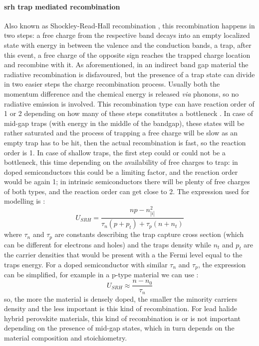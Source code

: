 		\paragraph{\gls{srh} trap mediated recombination}
		Also known as Shockley-Read-Hall recombination \cite{Shockley1952}, this recombination happens in two steps: a free charge from the respective band decays into an empty localized state with energy in between the valence and the conduction bands, a trap, after this event, a free charge of the opposite sign reaches the trapped charge location and recombine with it.
		As aforementioned, in an indirect band gap material the radiative recombination is disfavoured, but the presence of a trap state can divide in two easier steps the charge recombination process.
		Usually both the momentum difference and the chemical energy is released \textsl{via} phonons, so no radiative emission is involved.
		This recombination type can have reaction order of 1 or 2 depending on how many of these steps constitutes a bottleneck \cite{Calado2019}.
		In case of mid-gap traps (with energy in the middle of the bandgap), these states will be rather saturated and the process of trapping a free charge will be slow as an empty trap has to be hit, then the actual recombination is fast, so the reaction order is 1.
		In case of shallow traps, the first step could or could not be a bottleneck, this time depending on the availability of free charges to trap: in doped semiconductors this could be a limiting factor, and the reaction order would be again 1; in intrinsic semiconductors there will be plenty of free charges of both types, and the reaction order can get close to 2.
		The expression used for modelling is \cite{Shockley1952,Nelson2003}:
		\begin{equation}\label{eq:srh}
			U_{SRH} = \frac{np-n_|i|^2}{\tau_n(p+p_t)+ \tau_p(n+n_t)}
		\end{equation}
		where $\tau_n$ and $\tau_p$ are constants describing the trap capture cross section (which can be different for electrons and holes) and the traps density while $n_t$ and $p_t$ are the carrier densities that would be present with a the Fermi level equal to the traps energy.
		For a doped semiconductor with similar $\tau_n$ and $\tau_p$, the expression can be simplified, for example in a p-type material we can use \cite[108]{Nelson2003}:
		\begin{equation}
		U_{SRH} \approx \frac{n-n_0}{\tau_n}
		\end{equation}
		so, the more the material is densely doped, the smaller the minority carriers density and the less important is this kind of recombination.
		For lead halide hybrid perovskite materials, this kind of recombination is or is not important depending on the presence of mid-gap states, which in turn depends on the material composition and stoichiometry.

